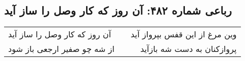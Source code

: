 \begin{center}
\section*{رباعی شماره ۴۸۲: آن روز که کار وصل را ساز آید}
\label{sec:0482}
\begin{longtable}{l p{0.5cm} r}
آن روز که کار وصل را ساز آید
&&
وین مرغ از این قفس بپرواز آید
\\
از شه چو صفیر ارجعی باز شود
&&
پروازکنان به دست شه بازآید
\\
\end{longtable}
\end{center}
